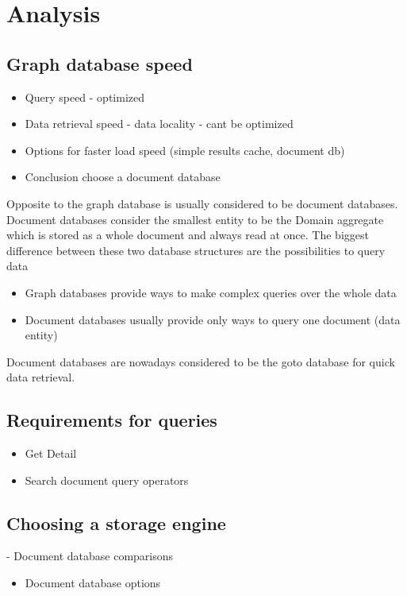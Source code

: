 \chapter{Analysis}

\section{Graph database speed}

\begin{itemize}
	\item Query speed - optimized
	\item Data retrieval speed - data locality - cant be optimized
	\item Options for faster load speed (simple results cache, document db)
	\item Conclusion choose a document database
\end{itemize}	
Opposite to the graph database is usually considered to be document databases. Document databases consider the smallest entity to be the Domain aggregate which is stored as a whole document and always read at once. The biggest difference between these two database structures are the possibilities to query data
\begin{itemize}
	\item Graph databases provide ways to make complex queries over the whole data
	\item Document databases usually provide only ways to query one document (data entity)
\end{itemize}
Document databases are nowadays considered to be the goto database for quick data retrieval.



\section{Requirements for queries}
\begin{itemize}
	\item Get Detail
	\item Search document query operators
			
\end{itemize}

\section{Choosing a storage engine}
- Document database comparisons
\begin{itemize}
	\item Document database options
\end{itemize}

